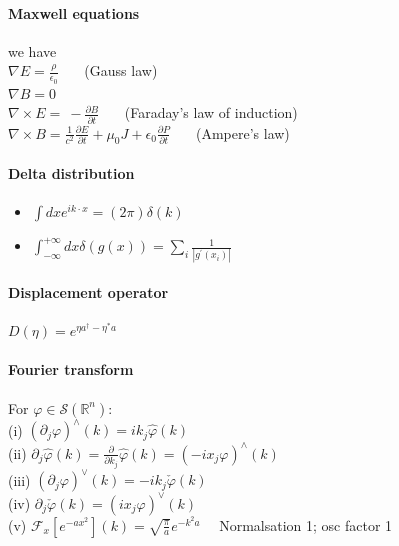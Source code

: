 \paragraph{Maxwell equations} we have \\
$ \nabla E = \frac{\rho}{\epsilon_0}  \quad  $  \ (Gauss law)   \\
$ \nabla B = 0 $ \\
$ \nabla \times E = \ - \frac{\partial B}{\partial t} \quad  $ \  (Faraday's law of induction) \\
$ \nabla \times B = \frac{1}{c^2} \frac{ \partial E}{\partial t} + \mu_0 J + \epsilon_0 \frac{\partial P} {\partial t} \quad $ \ (Ampere's law)

\paragraph{Delta distribution}
\begin{itemize}
  \item $\int d x e^{i k \cdot x}=(2 \pi) \delta(k)$
  \item $\int_{-\infty}^{+\infty} d x \delta(g(x))=\sum_i \frac{1}{\left|g^{\prime}\left(x_i\right)\right|} $
\end{itemize}

\paragraph{Displacement operator} $D(\eta)=e^{\eta a^{\dagger}-\eta^* a}$


\paragraph{Fourier transform } For $\varphi \in \mathscr{S}\left(\mathbb{R}^n\right)$:\\
(i) $\left(\partial_j \varphi\right)^{\wedge}(k)=i k_j \hat{\varphi}(k)$\\
(ii) $\partial_j \hat{\varphi}(k)=\frac{\partial}{\partial k_j} \hat{\varphi}(k)=\left(-i x_j \varphi\right)^{\wedge}(k)$\\
(iii) $\left(\partial_j \varphi\right)^{\vee}(k)=-i k_j \check{\varphi}(k)$\\
(iv) $\partial_j \check{\varphi}(k)=\left(i x_j \varphi\right)^{\vee}(k)$\\
(v) $\mathcal{F}_x\left[e^{-a x^2}\right](k)=\sqrt{\frac{\pi}{a}} e^{-k^2 a} \quad $ Normalsation 1; osc factor 1

